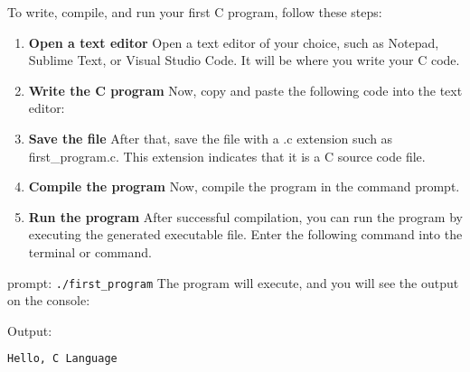 To write, compile, and run your first C program, follow these steps:
\begin{enumerate}
	\item \textbf{Open a text editor} Open a text editor of your choice, such as Notepad, Sublime Text, or Visual Studio Code. It will be where you write your C code.
	\item \textbf{Write the C program} Now, copy and paste the following code into the text editor:
	
	\item \textbf{Save the file} After that, save the file with a .c extension such as first\_program.c. This extension indicates that it is a C source code file.
	\item \textbf{Compile the program} Now, compile the program in the command prompt.
	\item \textbf{Run the program} After successful compilation, you can run the program by executing the generated executable file. Enter the following command into the terminal or command.
\end{enumerate}

prompt:
\texttt{./first\_program}
The program will execute, and you will see the output on the console:

Output:
\begin{lstlisting}[caption=Bash, label={lst:listing-cpp}, language=bash, style=myStyle]
	Hello, C Language
\end{lstlisting}